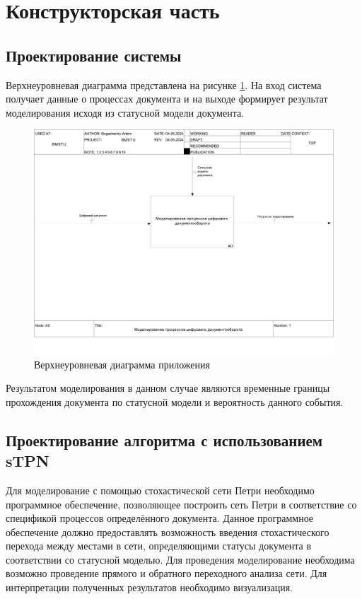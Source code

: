 \section{Конструкторская часть}

\subsection{Проектирование системы}

Верхнеуровневая диаграмма представлена на рисунке \ref{img:idef0}. На вход система получает данные о процессах документа и на выходе формирует результат моделирования исходя из статусной модели документа.

\begin{figure}[h!]
	\begin{center}
		\includegraphics[scale=0.3666]{inc/idef0.pdf}
	\end{center}
	\captionsetup{justification=centering}
	\caption{Верхнеуровневая диаграмма приложения}
	\label{img:idef0}
\end{figure}

Результатом моделирования в данном случае являются временные границы прохождения документа по статусной модели и вероятность данного события.

\subsection{Проектирование алгоритма с использованием sTPN}

Для моделирование с помощью стохастической сети Петри необходимо программное обеспечение, позволяющее построить сеть Петри в соответствие со спецификой процессов определённого документа. Данное программное обеспечение должно предоставлять возможность введения стохастического перехода между местами в сети, определяющими статусы документа в соответствии со статусной моделью. Для проведения моделирование необходима возможно проведение прямого и обратного переходного анализа сети. Для интерпретации полученных результатов необходимо визуализация.
